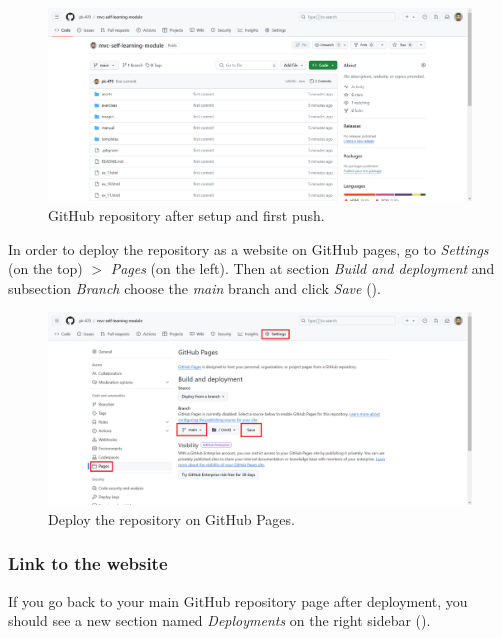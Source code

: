 \documentclass[a4paper,10pt]{article}
\begin{document}
\begin{figure}[htbp]
    \centering
    \includegraphics[width=\textwidth]{mvc_repository.png}
    \caption{GitHub repository after setup and first push.}
    \label{fig:mvc_repository}   
\end{figure}

In order to deploy the repository as a website on GitHub pages, go to \emph{Settings} (on the top) $>$ \emph{Pages} (on the left). Then at section \emph{Build and deployment} and subsection \emph{Branch} choose the \emph{main} branch and click \emph{Save} ().

\begin{figure}[htbp]
    \centering
    \includegraphics[width=\textwidth]{mvc_deploy.png}
    \caption{Deploy the repository on GitHub Pages.}
    \label{fig:mvc_deploy}   
\end{figure}

\subsubsection{Link to the website}

If you go back to your main GitHub repository page after deployment, you should see a new section named \emph{Deployments} on the right sidebar ().
\end{document}
